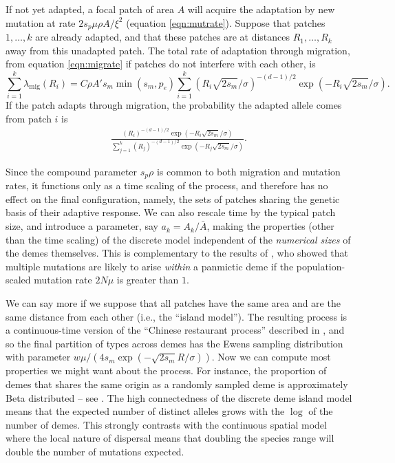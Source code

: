\documentclass{article}
\newcommand{\linelabel}[1]{}
\newcommand{\citet}[1]{\cite{#1}}
\newcommand{\migrate}{\lambda_\text{mig}}
\begin{document}
If not yet adapted, a focal patch of area $A$ will acquire the adaptation by new mutation at rate $2 s_p \mu \rho A/\xi^2$ (equation \eqref{eqn:mutrate}).
Suppose that patches $1, \ldots, k$ are already adapted,
and that these patches are at distances $R_1, \ldots, R_k$ away from this unadapted patch.
The total rate of adaptation through migration, from equation \eqref{eqn:migrate}
if patches do not interfere with each other, \linelabel{rr:interference}
is
\begin{equation} \label{eqn:total_migrate}
    \sum_{i=1}^k \migrate(R_i) = C \rho A' s_m \min(s_m,p_e) \sum_{i=1}^{k} \left(R_i \sqrt{2 s_m} /\sigma \right)^{-(d-1)/2} \exp\left(- R_i \sqrt{2 s_m} /\sigma\right).
\end{equation}
If the patch adapts through migration, the probability the adapted allele 
comes from patch $i$ is 
\begin{align}   \label{eqn:migprob}
  \frac{
      \left(R_i \right)^{-(d-1)/2} \exp\left(- R_i \sqrt{2 s_m} 
      /\sigma\right)
  } {
      \sum_{j=1}^{k}  \left(R_j \right)^{-(d-1)/2} \exp\left(- R_j \sqrt{2 s_m}
    /\sigma\right) 
} .
\end{align}

Since the compound parameter $s_p \rho$ is common to both migration and mutation rates,
it functions only as a time scaling of the process, 
and therefore has no effect on the final configuration, namely, 
the sets of patches sharing the genetic basis of their adaptive response.
We can also rescale time by the typical patch size, and introduce a parameter, say $a_k = A_k/\bar A$,
making the properties (other than the time scaling) of the discrete model independent of the \emph{numerical sizes} of the demes themselves.
This is complementary to the results of \cite{softsweepsII}, who showed that multiple mutations are likely to arise \emph{within} a panmictic deme
if the population-scaled mutation rate $2 N \mu$ is greater than $1$.

We can say more if we suppose that all patches have the same area and are the same distance from each other
(i.e., the ``island model'').
The resulting process is a continuous-time version of the ``Chinese restaurant process''
described in \citet{aldous1985exchangeability}, %
and so the final partition of types across demes has the Ewens
sampling distribution with parameter $w \mu / (4 s_m \exp (-\sqrt{2 s_m}R/\sigma))$.
Now we can compute most properties we might want about the process.
For instance, the proportion of demes that shares the same origin as a randomly sampled deme
is approximately Beta distributed -- see \cite{donnelly1989continuity}.
The high connectedness of the discrete deme island model means that the expected number of distinct alleles
grows with the $\log$ of the number of demes.
This strongly contrasts with the continuous spatial model 
where the local nature of dispersal means that doubling the species range will double the number of mutations expected. 
\end{document}
